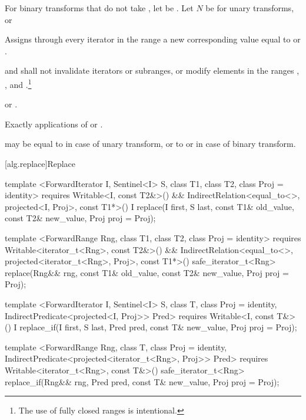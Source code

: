 \begin{itemdescr}
\pnum
For binary transforms that do not take , let 
be . Let $N$ be 
for unary transforms, or 

\pnum
\effects
Assigns through every iterator
in the range
a new
corresponding value equal to
or
.

\pnum
\requires
{} and 
shall not invalidate iterators or subranges, or modify elements in the ranges
,
,
and
.\footnote{The use of fully
closed ranges is intentional.}

\pnum
\returns
{}
 or .

\pnum
\complexity
Exactly
applications of
 or .

\pnum
\notes
{} may be equal to 
in case of unary transform,
or to  or 
in case of binary transform.
\end{itemdescr}

[alg.replace]{Replace}

%
%
\begin{itemdecl}
template <ForwardIterator I, Sentinel<I> S, class T1, class T2, class Proj = identity>
  requires Writable<I, const T2&>() &&
    IndirectRelation<equal_to<>, projected<I, Proj>, const T1*>()
  I
    replace(I first, S last, const T1& old_value, const T2& new_value, Proj proj = Proj{});

template <ForwardRange Rng, class T1, class T2, class Proj = identity>
  requires Writable<iterator_t<Rng>, const T2&>() &&
    IndirectRelation<equal_to<>, projected<iterator_t<Rng>, Proj>, const T1*>()
  safe_iterator_t<Rng>
    replace(Rng&& rng, const T1& old_value, const T2& new_value, Proj proj = Proj{});

template <ForwardIterator I, Sentinel<I> S, class T, class Proj = identity,
    IndirectPredicate<projected<I, Proj>> Pred>
  requires Writable<I, const T&>()
  I
    replace_if(I first, S last, Pred pred, const T& new_value, Proj proj = Proj{});

template <ForwardRange Rng, class T, class Proj = identity,
    IndirectPredicate<projected<iterator_t<Rng>, Proj>> Pred>
  requires Writable<iterator_t<Rng>, const T&>()
  safe_iterator_t<Rng>
    replace_if(Rng&& rng, Pred pred, const T& new_value, Proj proj = Proj{});
\end{itemdecl}

